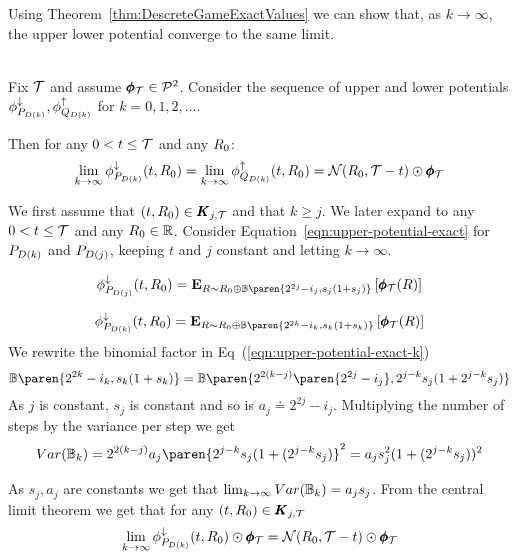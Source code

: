 \documentclass{article}[12pt]
\begin{document}
Using Theorem~\ref{thm:DescreteGameExactValues} we can show that, as
$k \to \infty$, the upper lower potential converge to the same limit.

\begin{theorem} \label{thm:seq-of-adv-strategies}
  ~\\
  Fix $\mathcal{T}$ and assume $\pmb{\phi}_{\mathcal{T}} \in {\cal P}^{2}$. Consider the sequence of upper
  and lower potentials  $\phi_{P_{D(k)}}^{\downarrow},\phi_{Q_{D(k)}}^{\uparrow}$ for
  $k=0,1,2,\ldots$.

  Then for any  $0 < t \leq \mathcal{T}$ and any $R_0$:
  \begin{equation} \label{eqn:k-limit}
    \lim_{k \to \infty} \phi_{P_{D(k)}}^{\downarrow}(t,R_0) =
    \lim_{k \to \infty}\phi_{Q_{D(k)}}^{\uparrow}(t,R_0)=
    {\cal N}(R_0,\mathcal{T}-t) \odot \pmb{\phi}_{\mathcal{T}}
  \end{equation}
\end{theorem}

\proof

We first assume that $(t,R_0) \in \pmb{K}_{j,\mathcal{T}}$ and that $k\geq j$. We later expand to any $0 < t \leq \mathcal{T}$ and any $R_0 \in \mathbb{R}$.
Consider Equation~\ref{eqn:upper-potential-exact} for $P_{D(k)}$ and $P_{D(j)}$,
keeping $t$ and $j$ constant and letting $k \to \infty$.

\begin{equation} \label{eqn:upper-potential-exact-j}
  \upperpotMdj(t,\R_0) =  \E{\R \sim \R_0 \oplus
    \Binom\paren{2^{2j}-i_j,s_j(1+s_j)}}{\finalPotR(\R)}
\end{equation}

\begin{equation} \label{eqn:upper-potential-exact-k}
  \upperpotMdk(t,\R_0) =  \E{\R \sim \R_0 \oplus
    \Binom\paren{2^{2k}-i_k,s_k(1+s_k)}}{\finalPotR(\R)}
\end{equation}
We rewrite the binomial factor in
Eq~(\ref{eqn:upper-potential-exact-k})
$$
 \Binom\paren{2^{2k}-i_k,s_k(1+s_k)} =
 \Binom\paren{2^{2(k-j)}\paren{2^{2j}-i_j},2^{j-k} s_j(1+2^{j-k} s_j)}
 $$
As $j$ is constant, $s_j$ is constant and so is $a_j \doteq
2^{2j}-i_j$. Multiplying the number of steps by the variance per step
we get
$$Var(\Binom_k) = 2^{2(k-j)}a_j\paren{2^{j-k} s_j(1+(2^{j-k} s_j)}^2
= a_j s_j^2 (1+(2^{j-k} s_j))^2 
$$

As $s_j,a_j$ are constants we get that $\lim_{k \to \infty}
Var(\mathbb{B}_k) = a_j s_j$.  From the central limit theorem we get that
for any $(t,R_0) \in \pmb{K}_{j,\mathcal{T}}$
\begin{equation} \label{eqn:conergence-for-k}
  \lim_{k \to \infty} \phi_{P_{D(k)}}^{\downarrow}(t,R_0) \odot \pmb{\phi}_{\mathcal{T}} = {\cal
    N}(R_0,\mathcal{T}-t) \odot \pmb{\phi}_{\mathcal{T}}
\end{equation}
\end{document}

